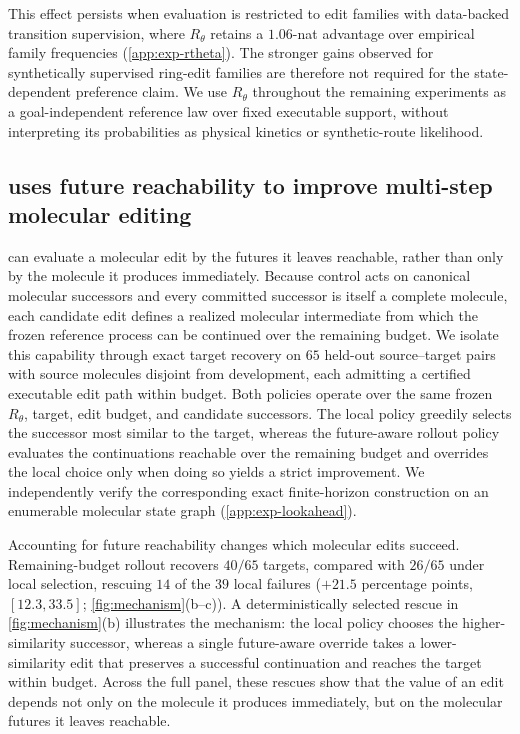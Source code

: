 This effect persists when evaluation is restricted to edit families with data-backed transition supervision, where $R_\theta$ retains a $1.06$-nat advantage over empirical family frequencies (\cref{app:exp-rtheta}). The stronger gains observed for synthetically supervised ring-edit families are therefore not required for the state-dependent preference claim. We use $R_\theta$ throughout the remaining experiments as a goal-independent reference law over fixed executable support, without interpreting its probabilities as physical kinetics or synthetic-route likelihood.

\subsection{\method{} uses future reachability to improve multi-step molecular editing}
\label{sec:exp-lookahead}

\method{} can evaluate a molecular edit by the futures it leaves reachable, rather than only by the molecule it produces immediately. Because control acts on canonical molecular successors and every committed successor is itself a complete molecule, each candidate edit defines a realized molecular intermediate from which the frozen reference process can be continued over the remaining budget. We isolate this capability through exact target recovery on $65$ held-out source--target pairs with source molecules disjoint from development, each admitting a certified executable edit path within budget. Both policies operate over the same frozen $R_\theta$, target, edit budget, and candidate successors. The local policy greedily selects the successor most similar to the target, whereas the future-aware rollout policy evaluates the continuations reachable over the remaining budget and overrides the local choice only when doing so yields a strict improvement. We independently verify the corresponding exact finite-horizon construction on an enumerable molecular state graph (\cref{app:exp-lookahead}).

Accounting for future reachability changes which molecular edits succeed. Remaining-budget rollout recovers $40/65$ targets, compared with $26/65$ under local selection, rescuing $14$ of the $39$ local failures ($+21.5$ percentage points, $[12.3,33.5]$; \cref{fig:mechanism}(b--c)). A deterministically selected rescue in \cref{fig:mechanism}(b) illustrates the mechanism: the local policy chooses the higher-similarity successor, whereas a single future-aware override takes a lower-similarity edit that preserves a successful continuation and reaches the target within budget. Across the full panel, these rescues show that the value of an edit depends not only on the molecule it produces immediately, but on the molecular futures it leaves reachable.

